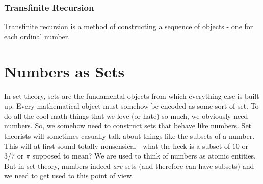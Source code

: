 
\subsubsection{Transfinite Recursion}
Transfinite recursion is a method of constructing a sequence of objects - one for each ordinal number.













\section{Numbers as Sets}
In set theory, sets are the fundamental objects from which everything else is built up. Every mathematical object must somehow be encoded as some sort of set. To do all the cool math things that we love (or hate) so much, we obviously need numbers. So, we somehow need to construct sets that behave like numbers. Set theorists will sometimes casually talk about things like the subsets of a number. This will at first sound totally nonsensical - what the heck is a subset of $10$ or $3/7$ or $\pi$ supposed to mean? We are used to think of numbers as atomic entities. But in set theory, numbers indeed \emph{are} sets (and therefore can have subsets) and we need to get used to this point of view.

% 


